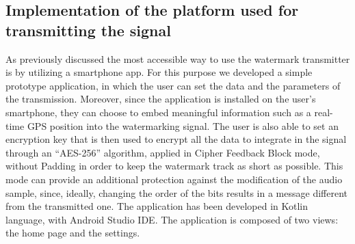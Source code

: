 \subsection{Implementation of the platform used for transmitting the signal}
As previously discussed the most accessible way to use the watermark transmitter is by utilizing a smartphone app. For this purpose we developed a simple prototype application, in which the user can set the data and the parameters of the transmission. Moreover, since the application is installed on the user's smartphone, they can choose to embed meaningful information such as a real-time GPS position into the watermarking signal. The user is also able to set an encryption key that is then used to encrypt all the data to integrate in the signal through an “AES-256” algorithm, applied in Cipher Feedback Block mode, without Padding in order to keep the watermark track as short as possible. This mode can provide an additional protection against the modification of the audio sample, since, ideally, changing the order of the bits results in a message different from the transmitted one.
The application has been developed in Kotlin language, with Android Studio IDE.
The application is composed of two views: the home page and the settings.
